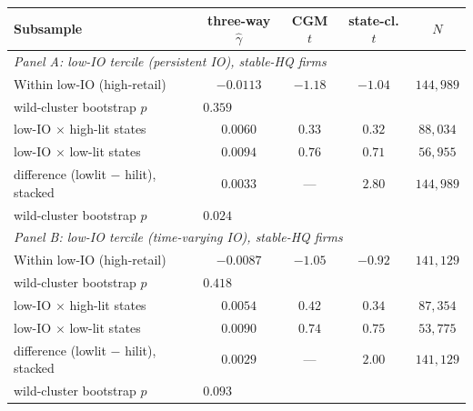 \begin{tabular}{lcccc}
\hline\hline
Subsample & three-way $\hat\gamma$ & CGM $t$ & state-cl. $t$ & $N$ \\
\hline
\multicolumn{5}{l}{\textit{Panel A: low-IO tercile (persistent IO), stable-HQ firms}} \\
Within low-IO (high-retail) & $-0.0113$ & $-1.18$ & $-1.04$ & $144,989$ \\
\quad wild-cluster bootstrap $p$ & \multicolumn{4}{l}{$0.359$} \\
\quad low-IO $\times$ high-lit states & $0.0060$ & $0.33$ & $0.32$ & $88,034$ \\
\quad low-IO $\times$ low-lit states & $0.0094$ & $0.76$ & $0.71$ & $56,955$ \\
\quad difference (lowlit $-$ hilit), stacked & $0.0033$ & --- & $2.80$ & $144,989$ \\
\quad\quad wild-cluster bootstrap $p$ & \multicolumn{4}{l}{$0.024$} \\
\hline
\multicolumn{5}{l}{\textit{Panel B: low-IO tercile (time-varying IO), stable-HQ firms}} \\
Within low-IO (high-retail) & $-0.0087$ & $-1.05$ & $-0.92$ & $141,129$ \\
\quad wild-cluster bootstrap $p$ & \multicolumn{4}{l}{$0.418$} \\
\quad low-IO $\times$ high-lit states & $0.0054$ & $0.42$ & $0.34$ & $87,354$ \\
\quad low-IO $\times$ low-lit states & $0.0090$ & $0.74$ & $0.75$ & $53,775$ \\
\quad difference (lowlit $-$ hilit), stacked & $0.0029$ & --- & $2.00$ & $141,129$ \\
\quad\quad wild-cluster bootstrap $p$ & \multicolumn{4}{l}{$0.093$} \\
\hline\hline
\end{tabular}
